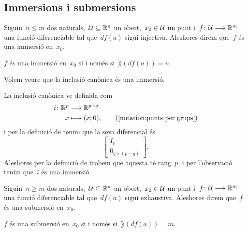 \documentclass[../../Main.tex]{subfiles}
\begin{document}
	\subsection{Immersions i submersions}
	\begin{definition}[Immersió]
		\label{def:immersió}
		Siguin~\(n\leq m\) dos naturals,~\(\mathcal{U}\subseteq\mathbb{R}^{n}\) un obert,~\(x_{0}\in\mathcal{U}\) un punt i~\(f\colon\mathcal{U}\longrightarrow\mathbb{R}^{m}\) una funció diferenciable tal que~\(df(a)\) sigui injectiva.
		Aleshores direm que~\(f\) és una immersió en~\(x_{0}\).
	\end{definition}
	\begin{observation} %
		\label{obs:immersió si i només si té rang maximal}
		\(f\) és una immersió en~\(x_{0}\) si i només si~\(\rang(df(a))=n\).
	\end{observation}
	\begin{example}
		\label{ex:la inclusió canònica és una immersió}
		Volem veure que la inclusió canònica és una immersió.
		\begin{solution}
			La inclusió canònica ve definida com
			\begin{align*}
				i\colon\mathbb{R}^{p}&\longrightarrow\mathbb{R}^{p+q} \\
				x&\longmapsto(x;0), \tag{\ref{notation:punts per grups}}
			\end{align*}
			i per la definició de  tenim que la seva diferencial és
			\[\left[\begin{array}{c}
				I_{p} \\\hline
				0_{q\times(p-q)}
			\end{array}\right].\]
			Aleshores per la definició de  trobem que aquesta té rang~\(p\), i per l'observació  tenim que~\(i\) és una immersió.
		\end{solution}
	\end{example}
	\begin{definition}[Submersió]
		\label{def:submersió}
		Siguin~\(n\geq m\) dos naturals,~\(\mathcal{U}\subseteq\mathbb{R}^{n}\) un obert,~\(x_{0}\in\mathcal{U}\) un punt i~\(f\colon\mathcal{U}\longrightarrow\mathbb{R}^{m}\) una funció diferenciable tal que~\(df(a)\) sigui exhaustiva.
		Aleshores direm que~\(f\) és una submersió en~\(x_{0}\).
	\end{definition}
	\begin{observation}
		\label{obs:submersió si i només si té rang més petit o igual}
		\(f\) és una submersió en~\(x_{0}\) si i només si~\(\rang(df(a))=m\).
	\end{observation}
\end{document}
